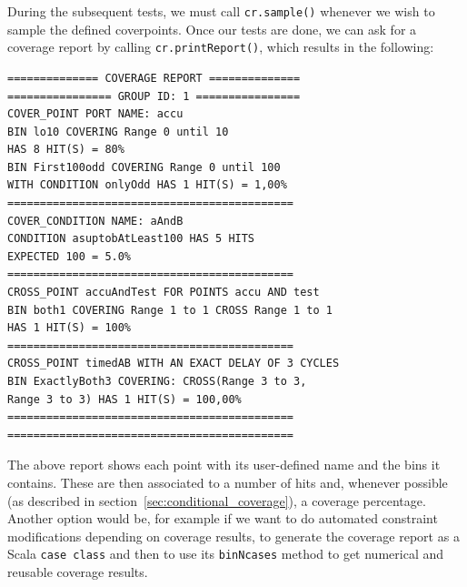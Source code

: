 \documentclass[conference]{IEEEtran}
\begin{document}
During the subsequent tests, we must call \texttt{cr.sample()} whenever we wish to sample the defined coverpoints. %
Once our tests are done, we can ask for a coverage report by calling \texttt{cr.printReport()}, which results in the following: 
\begin{verbatim}
============== COVERAGE REPORT ==============
================ GROUP ID: 1 ================
COVER_POINT PORT NAME: accu
BIN lo10 COVERING Range 0 until 10 
HAS 8 HIT(S) = 80%
BIN First100odd COVERING Range 0 until 100 
WITH CONDITION onlyOdd HAS 1 HIT(S) = 1,00%
============================================
COVER_CONDITION NAME: aAndB
CONDITION asuptobAtLeast100 HAS 5 HITS 
EXPECTED 100 = 5.0%
============================================
CROSS_POINT accuAndTest FOR POINTS accu AND test
BIN both1 COVERING Range 1 to 1 CROSS Range 1 to 1 
HAS 1 HIT(S) = 100%
============================================
CROSS_POINT timedAB WITH AN EXACT DELAY OF 3 CYCLES
BIN ExactlyBoth3 COVERING: CROSS(Range 3 to 3, 
Range 3 to 3) HAS 1 HIT(S) = 100,00%
============================================
============================================
\end{verbatim}
The above report shows each point with its user-defined name and the bins it contains. These are then associated to a number of hits and, whenever possible (as described in section~\ref{sec:conditional_coverage}), a coverage percentage.
Another option would be, for example if we want to do automated constraint modifications depending on coverage results, to generate the coverage report as a Scala \texttt{case class} and then to use its \texttt{binNcases} method to get numerical and reusable coverage results.  
\end{document}
